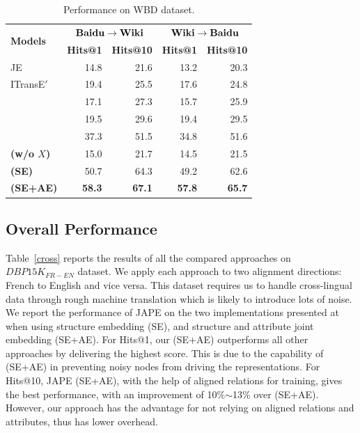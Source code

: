 \begin{table}
	\centering
	\scriptsize
	\begin{tabular}{lrrrr}
		\toprule
		\multirow{2}{*}{\bf Models} &  \multicolumn{2}{c|}{$\bf Baidu \rightarrow Wiki$} & \multicolumn{2}{c}{$\bf Wiki \rightarrow Baidu$} \\
		& \bf Hits@1 & \bf Hits@10 & \bf Hits@1 & \bf Hits@10 \\
		\midrule
		\rowcolor{Gray} JE & 14.8 & 21.6 & 13.2 & 20.3 \\
		ITransE$'$ & 19.4 & 25.5 & 17.6 & 24.8 \\
		\rowcolor{Gray} \GCN & 17.1 & 27.3 & 15.7 & 25.9 \\
		\HGCN & 19.5 & 29.6 & 19.4 & 29.5  \\
		\rowcolor{Gray} \RGCN & 37.3 & 51.5 & 34.8 & 51.6 \\
		\bf \HRGCN (w/o $X$) & 15.0 & 21.7 & 14.5 & 21.5 \\
		\rowcolor{Gray} \bf \HRGCN (SE) & 50.7 & 64.3 & 49.2 & 62.6 \\
		\bf \HRGCN (SE+AE) & \bf 58.3 & \bf 67.1 & \bf 57.8{\tiny } & \bf 65.7 \\
		\bottomrule
	\end{tabular}
	\caption{Performance on WBD dataset.}
	\label{f1}
\end{table}
\subsection{Overall Performance\label{overall}}


 Table~\ref{cross} reports the results of all the compared approaches on $DBP15K_{FR-EN}$
dataset. We apply each approach
 to two alignment directions: French to English and vice versa. This dataset requires us to handle
cross-lingual data through rough machine translation which is likely to introduce lots of noise. We report the performance of JAPE on the
two implementations presented at
 ~\cite{sun2017cross} when using structure embedding (SE), and structure and attribute joint embedding (SE+AE).
For Hits@1, our \HRGCN (SE+AE)
outperforms all other approaches by delivering the highest score. This is due to the capability of \HRGCN
(SE+AE) in preventing noisy nodes from driving the \KG representations. For Hits@10, JAPE (SE+AE), with the help of aligned relations for training,
 gives the best performance, with an improvement of 10\%$\sim$13\% over \HRGCN (SE+AE). However, our approach has the advantage for not relying on aligned
relations and attributes, thus has lower overhead.


